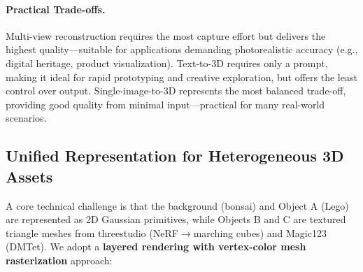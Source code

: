 \documentclass{article}
\begin{document}
\paragraph{Practical Trade-offs.}
Multi-view reconstruction requires the most capture effort but delivers the
highest quality---suitable for applications demanding photorealistic accuracy
(e.g., digital heritage, product visualization). Text-to-3D requires only a
prompt, making it ideal for rapid prototyping and creative exploration, but
offers the least control over output. Single-image-to-3D represents the most
balanced trade-off, providing good quality from minimal input---practical for
many real-world scenarios.

\subsection{Unified Representation for Heterogeneous 3D Assets}
\label{sec:unified}

A core technical challenge is that the background (bonsai) and Object A (Lego)
are represented as 2D Gaussian primitives, while Objects B and C are textured
triangle meshes from threestudio (NeRF$\rightarrow$marching cubes) and Magic123
(DMTet). We adopt a \textbf{layered rendering with vertex-color mesh
rasterization} approach:
\end{document}

